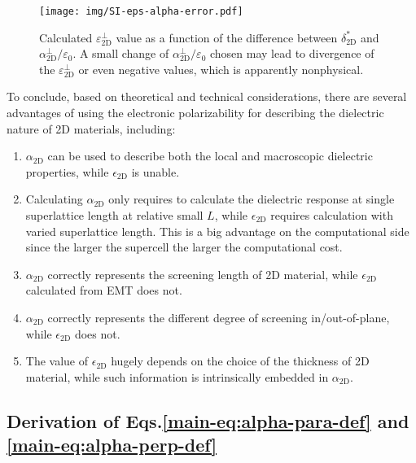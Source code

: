 \documentclass[journal=ancac3,email=true,hyperref=true,keywords=false]{achemso}
\begin{document}
\begin{figure}[htbp]
  \centering
  \texttt{[image: img/SI-eps-alpha-error.pdf]}
  \caption{Calculated $\varepsilon_{\mathrm{2D}}^{\perp}$ value as a
    function of the difference between $\delta_{\mathrm{2D}}^{*}$ and
    $\alpha_{\mathrm{2D}}^{\perp}/\varepsilon_{0}$. A small change of
    $\alpha_{\mathrm{2D}}^{\perp}/\varepsilon_{0}$ chosen may lead to divergence of
    the $\varepsilon_{\mathrm{2D}}^{\perp}$ or even negative values,
    which is apparently nonphysical.}
  \label{fig:eps-alpha-error}
\end{figure}

To conclude, based on theoretical and technical considerations, there are several
advantages of using the electronic polarizability for describing the dielectric
nature of 2D materials, including:
%
\begin{enumerate}
\item $\alpha_{\mathrm{2D}}$ can be used to describe both the local and macroscopic dielectric properties, while $\epsilon_{\mathrm{2D}}$ is unable. 

\item Calculating $\alpha_{\mathrm{2D}}$ only requires to calculate the dielectric response at single superlattice length at relative small $L$, while $\epsilon_{\mathrm{2D}}$ requires calculation with varied superlattice length. This is a big advantage on the computational side since the larger the supercell the larger the computational cost. 

\item $\alpha_{\mathrm{2D}}$ correctly represents the screening length of 2D material, while $\epsilon_{\mathrm{2D}}$ calculated from EMT does not. 

\item $\alpha_{\mathrm{2D}}$ correctly represents the different degree of screening in/out-of-plane, while $\epsilon_{\mathrm{2D}}$ does not.
  
\item The value of $\epsilon_{\mathrm{2D}}$ hugely depends on the
  choice of the thickness of 2D material, while such information is
  intrinsically embedded in $\alpha_{\mathrm{2D}}$.
\end{enumerate}
%
%



\subsection{Derivation of Eqs.\ref{main-eq:alpha-para-def} and \ref{main-eq:alpha-perp-def}}
\end{document}
